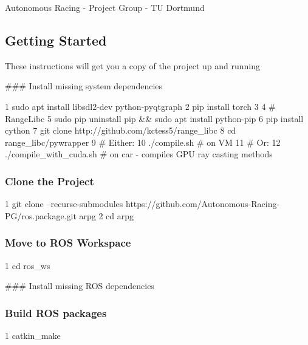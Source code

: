 Autonomous Racing -\/ Project Group -\/ TU Dortmund

\href{https://travis-ci.com/Autonomous-Racing-PG/ros.package}{\tt }

\subsection*{Getting Started}

These instructions will get you a copy of the project up and running

\#\#\# Install missing system dependencies 
\begin{DoxyCode}
1 sudo apt install libsdl2-dev python-pyqtgraph
2 pip install torch
3 
4 # RangeLibc
5 sudo pip uninstall pip && sudo apt install python-pip
6 pip install cython
7 git clone http://github.com/kctess5/range\_libc
8 cd range\_libc/pywrapper
9 # Either:
10 ./compile.sh            # on VM
11 # Or:
12 ./compile\_with\_cuda.sh  # on car - compiles GPU ray casting methods
\end{DoxyCode}


\subsubsection*{Clone the Project}


\begin{DoxyCode}
1 git clone --recurse-submodules https://github.com/Autonomous-Racing-PG/ros.package.git arpg
2 cd arpg
\end{DoxyCode}


\subsubsection*{Move to R\+OS Workspace}


\begin{DoxyCode}
1 cd ros\_ws
\end{DoxyCode}


\#\#\# Install missing R\+OS dependencies 


\subsubsection*{Build R\+OS packages}


\begin{DoxyCode}
1 catkin\_make
\end{DoxyCode}


